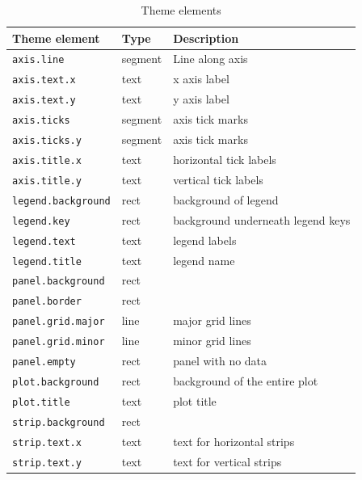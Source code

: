 \begin{table}
  \begin{center}
  \begin{tabular}{lll}\\
    \toprule
    Theme element              & Type     & Description  \\
    \midrule                              
    \texttt{axis.line}         & segment  & Line along axis  \\
    \texttt{axis.text.x}       & text     & x axis label  \\
    \texttt{axis.text.y}       & text     & y axis label  \\
    \texttt{axis.ticks}        & segment  & axis tick marks  \\
    \texttt{axis.ticks.y}      & segment  & axis tick marks  \\
    \texttt{axis.title.x}      & text     & horizontal tick labels  \\
    \texttt{axis.title.y}      & text     & vertical tick labels  \\[0.5em]
    \texttt{legend.background} & rect     & background of legend  \\
    \texttt{legend.key}        & rect     & background underneath legend keys \\
    \texttt{legend.text}       & text     & legend labels  \\
    \texttt{legend.title}      & text     & legend name  \\[0.5em]
    \texttt{panel.background}  & rect     &   \\
    \texttt{panel.border}      & rect     &   \\
    \texttt{panel.grid.major}  & line     & major grid lines \\
    \texttt{panel.grid.minor}  & line     & minor grid lines \\[0.5em]
    \texttt{panel.empty}       & rect     & panel with no data   \\
    \texttt{plot.background}   & rect     & background of the entire plot \\
    \texttt{plot.title}        & text     & plot title   \\[0.5em]
    \texttt{strip.background}  & rect     &   \\
    \texttt{strip.text.x}      & text     & text for horizontal strips  \\
    \texttt{strip.text.y}      & text     & text for vertical strips  \\
    \bottomrule                           
  
  \end{tabular}
  \end{center}
  \caption{Theme elements}
  \label{tbl:elements}
\end{table}

